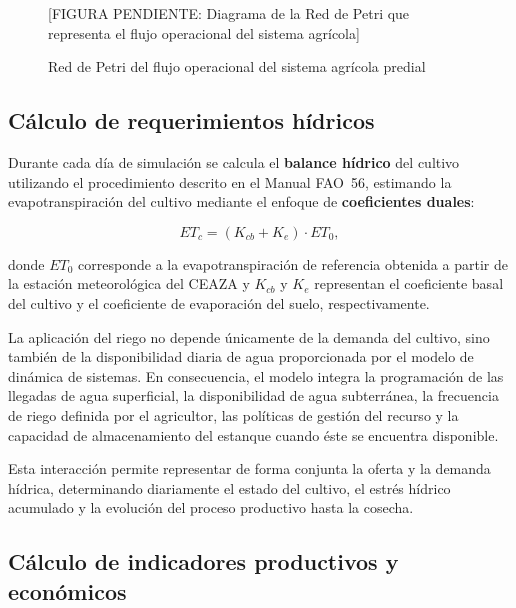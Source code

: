 \documentclass[12pt]{report}
\begin{document}
\begin{figure}[H]
    \centering
    \vspace{0.3cm}
    [FIGURA PENDIENTE: Diagrama de la Red de Petri que representa el flujo operacional del sistema agrícola]
    \caption{Red de Petri del flujo operacional del sistema agrícola predial}
    \label{fig:petri_demand}
\end{figure}

\subsection{Cálculo de requerimientos hídricos}

Durante cada día de simulación se calcula el \textbf{balance hídrico} del cultivo utilizando el procedimiento descrito en el Manual FAO~56, estimando la evapotranspiración del cultivo mediante el enfoque de \textbf{coeficientes duales}:

\[
ET_c=(K_{cb}+K_e)\cdot ET_0,
\]

donde $ET_0$ corresponde a la evapotranspiración de referencia obtenida a partir de la estación meteorológica del CEAZA y $K_{cb}$ y $K_e$ representan el coeficiente basal del cultivo y el coeficiente de evaporación del suelo, respectivamente.

La aplicación del riego no depende únicamente de la demanda del cultivo, sino también de la disponibilidad diaria de agua proporcionada por el modelo de dinámica de sistemas. En consecuencia, el modelo integra la programación de las llegadas de agua superficial, la disponibilidad de agua subterránea, la frecuencia de riego definida por el agricultor, las políticas de gestión del recurso y la capacidad de almacenamiento del estanque cuando éste se encuentra disponible.

Esta interacción permite representar de forma conjunta la oferta y la demanda hídrica, determinando diariamente el estado del cultivo, el estrés hídrico acumulado y la evolución del proceso productivo hasta la cosecha.
\subsection{Cálculo de indicadores productivos y económicos}
\end{document}

